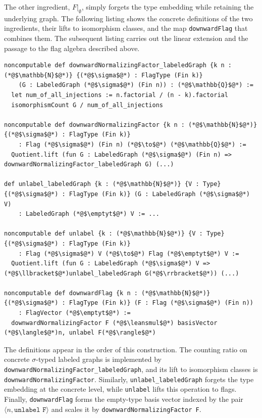 \documentclass{article}
\newcommand{\lean}[1]{\texttt{#1}}
\newcommand{\emptyt}{\emptyset_{\mathrm{t}}}
\newcommand{\leansmul}{\mathbin{\vcenter{\hbox{$\scriptstyle\bullet$}}}}
\begin{document}
The other ingredient, $F|_\emptyset$, simply forgets the type embedding while
retaining the underlying graph.  The following listing shows the concrete
definitions of the two ingredients, their lifts to isomorphism classes, and
the map \lean{downwardFlag} that combines them.  The subsequent listing carries
out the linear extension and the passage to the flag algebra described above.
\begin{lstlisting}
noncomputable def downwardNormalizingFactor_labeledGraph {k n : (*@$\mathbb{N}$@*)} {(*@$\sigma$@*) : FlagType (Fin k)}
    (G : LabeledGraph (*@$\sigma$@*) (Fin n)) : (*@$\mathbb{Q}$@*) :=
  let num_of_all_injections := n.factorial / (n - k).factorial
  isomorphismCount G / num_of_all_injections

noncomputable def downwardNormalizingFactor {k n : (*@$\mathbb{N}$@*)} {(*@$\sigma$@*) : FlagType (Fin k)}
    : Flag (*@$\sigma$@*) (Fin n) (*@$\to$@*) (*@$\mathbb{Q}$@*) :=
  Quotient.lift (fun G : LabeledGraph (*@$\sigma$@*) (Fin n) => downwardNormalizingFactor_labeledGraph G) (...)

def unlabel_labeledGraph {k : (*@$\mathbb{N}$@*)} {V : Type} {(*@$\sigma$@*) : FlagType (Fin k)} (G : LabeledGraph (*@$\sigma$@*) V)
    : LabeledGraph (*@$\emptyt$@*) V := ...

noncomputable def unlabel {k : (*@$\mathbb{N}$@*)} {V : Type} {(*@$\sigma$@*) : FlagType (Fin k)}
    : Flag (*@$\sigma$@*) V (*@$\to$@*) Flag (*@$\emptyt$@*) V :=
  Quotient.lift (fun G : LabeledGraph (*@$\sigma$@*) V => (*@$\llbracket$@*)unlabel_labeledGraph G(*@$\rrbracket$@*)) (...)

noncomputable def downwardFlag {k n : (*@$\mathbb{N}$@*)} {(*@$\sigma$@*) : FlagType (Fin k)} (F : Flag (*@$\sigma$@*) (Fin n))
    : FlagVector (*@$\emptyt$@*) :=
  downwardNormalizingFactor F (*@$\leansmul$@*) basisVector (*@$\langle$@*)n, unlabel F(*@$\rangle$@*)
\end{lstlisting}

The definitions appear in the order of this construction.  The counting ratio
on concrete $\sigma$-typed labeled graphs is implemented by
\lean{downwardNormalizingFactor\_labeledGraph}, and its lift to isomorphism
classes is \lean{downwardNormalizingFactor}.
Similarly, \lean{unlabel\_labeledGraph} forgets the type embedding at the concrete
level, while \lean{unlabel} lifts this operation to flags.  Finally,
\lean{downwardFlag} forms the empty-type basis vector indexed by the pair
$\langle n,\lean{unlabel F}\rangle$ and scales it by
\lean{downwardNormalizingFactor F}.
\end{document}
